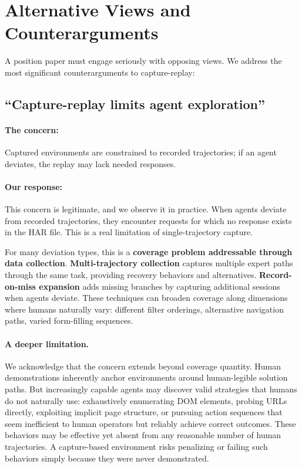 \documentclass[letterpaper]{article}
\begin{document}
\section{Alternative Views and Counterarguments}
\label{sec:counterarguments}

A position paper must engage seriously with opposing views. We address the most significant counterarguments to capture-replay:

\subsection{``Capture-replay limits agent exploration''}
\label{sec:exploration}

\paragraph{The concern:} Captured environments are constrained to recorded trajectories; if an agent deviates, the replay may lack needed responses.

\paragraph{Our response:} This concern is legitimate, and we observe it in practice. When agents deviate from recorded trajectories, they encounter requests for which no response exists in the HAR file. This is a real limitation of single-trajectory capture.

For many deviation types, this is a \textbf{coverage problem addressable through data collection}. \textbf{Multi-trajectory collection} captures multiple expert paths through the same task, providing recovery behaviors and alternatives. \textbf{Record-on-miss expansion} adds missing branches by capturing additional sessions when agents deviate. These techniques can broaden coverage along dimensions where humans naturally vary: different filter orderings, alternative navigation paths, varied form-filling sequences.

\paragraph{A deeper limitation.} We acknowledge that the concern extends beyond coverage quantity. Human demonstrations inherently anchor environments around human-legible solution paths. But increasingly capable agents may discover valid strategies that humans do not naturally use: exhaustively enumerating DOM elements, probing URLs directly, exploiting implicit page structure, or pursuing action sequences that seem inefficient to human operators but reliably achieve correct outcomes. These behaviors may be effective yet absent from any reasonable number of human trajectories. A capture-based environment risks penalizing or failing such behaviors simply because they were never demonstrated.
\end{document}
